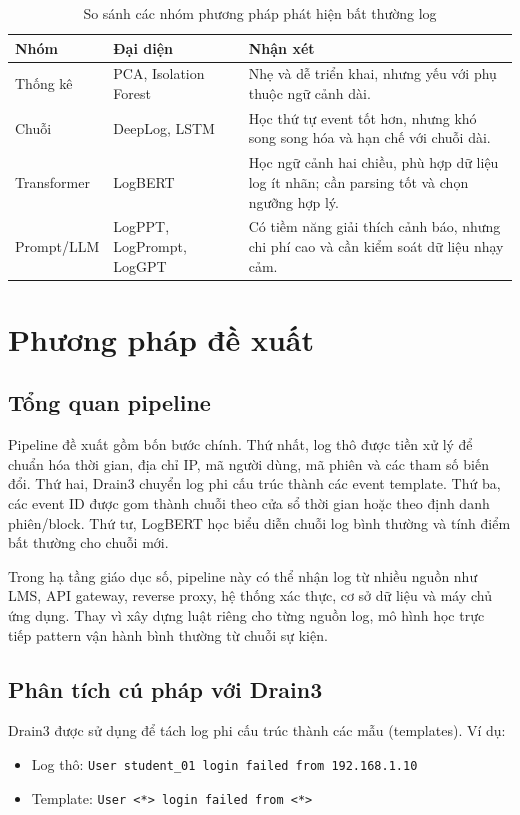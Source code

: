 \documentclass[conference]{IEEEtran}
\begin{document}
\begin{table}[!t]
\caption{So sánh các nhóm phương pháp phát hiện bất thường log}
\begin{center}
\scriptsize
\begin{tabular}{p{1.35cm}p{1.55cm}p{3.1cm}}
\toprule
\textbf{Nhóm} & \textbf{Đại diện} & \textbf{Nhận xét} \\
\midrule
Thống kê & PCA, Isolation Forest & Nhẹ và dễ triển khai, nhưng yếu với phụ thuộc ngữ cảnh dài. \\
Chuỗi & DeepLog, LSTM & Học thứ tự event tốt hơn, nhưng khó song song hóa và hạn chế với chuỗi dài. \\
Transformer & LogBERT & Học ngữ cảnh hai chiều, phù hợp dữ liệu log ít nhãn; cần parsing tốt và chọn ngưỡng hợp lý. \\
Prompt/LLM & LogPPT, LogPrompt, LogGPT & Có tiềm năng giải thích cảnh báo, nhưng chi phí cao và cần kiểm soát dữ liệu nhạy cảm. \\
\bottomrule
\end{tabular}
\label{tab_related_work}
\end{center}
\end{table}

\section{Phương pháp đề xuất}
\subsection{Tổng quan pipeline}
Pipeline đề xuất gồm bốn bước chính. Thứ nhất, log thô được tiền xử lý để chuẩn hóa thời gian, địa chỉ IP, mã người dùng, mã phiên và các tham số biến đổi. Thứ hai, Drain3 chuyển log phi cấu trúc thành các event template. Thứ ba, các event ID được gom thành chuỗi theo cửa sổ thời gian hoặc theo định danh phiên/block. Thứ tư, LogBERT học biểu diễn chuỗi log bình thường và tính điểm bất thường cho chuỗi mới.

Trong hạ tầng giáo dục số, pipeline này có thể nhận log từ nhiều nguồn như LMS, API gateway, reverse proxy, hệ thống xác thực, cơ sở dữ liệu và máy chủ ứng dụng. Thay vì xây dựng luật riêng cho từng nguồn log, mô hình học trực tiếp pattern vận hành bình thường từ chuỗi sự kiện.

\subsection{Phân tích cú pháp với Drain3}
Drain3 được sử dụng để tách log phi cấu trúc thành các mẫu (templates). Ví dụ:
\begin{itemize}
    \item Log thô: \texttt{User student\_01 login failed from 192.168.1.10}
    \item Template: \texttt{User <*> login failed from <*>}
\end{itemize}
\end{document}
